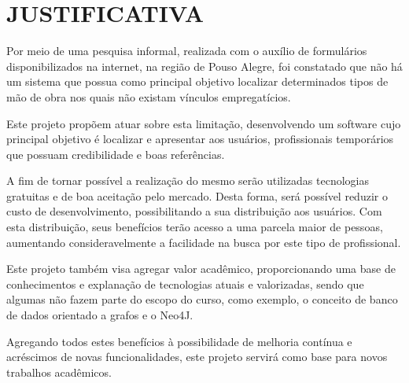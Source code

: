 \chapter{JUSTIFICATIVA}

\par Por meio de uma pesquisa informal, realizada com o auxílio de formulários disponibilizados na internet, na região de Pouso Alegre, foi constatado que não há um sistema que possua como principal objetivo localizar determinados tipos de mão de obra nos quais não existam vínculos empregatícios.

\par Este projeto propõem atuar sobre esta limitação, desenvolvendo um software cujo principal objetivo é localizar e apresentar aos usuários, profissionais temporários que possuam credibilidade e boas referências.
	
\par A fim de tornar possível a realização do mesmo serão utilizadas tecnologias gratuitas e de boa aceitação pelo mercado. Desta forma, será possível reduzir o custo de desenvolvimento, possibilitando a sua distribuição aos usuários. Com esta distribuição, seus benefícios terão acesso a uma parcela maior de pessoas, aumentando consideravelmente a facilidade na busca por este tipo de profissional.
	
\par Este projeto também visa agregar valor acadêmico, proporcionando uma base de conhecimentos e explanação de tecnologias atuais e valorizadas, sendo que algumas não fazem parte do escopo do curso, como exemplo, o conceito de banco de dados orientado a grafos e o Neo4J.
	
\par Agregando todos estes benefícios à possibilidade de melhoria contínua e acréscimos de novas funcionalidades, este projeto servirá como base para novos trabalhos acadêmicos.